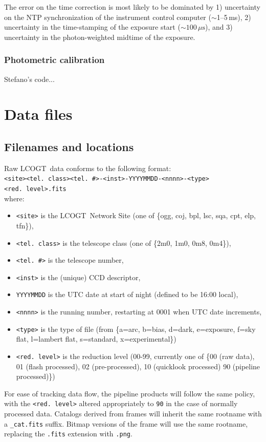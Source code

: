 \documentclass[twoside,11pt,nolof]{starlink}
\providecommand{\LCO}{LCOGT}
\providecommand{\rmn}[1] {\mathrm{#1}}
\begin{document}
The error on the time correction is most likely to be dominated by 1)
uncertainty on the NTP synchronization of the instrument control computer
($\sim$1--5\,ms), 2) uncertainty in the time-stamping of the exposure start
($\sim 100\,\mu\rmn{s}$), and 3) uncertainty in the photon-weighted midtime of the
exposure.

\subsubsection{Photometric calibration}
Stefano's code...

\section{Data files}

\subsection{Filenames and locations}
Raw \LCO\ data conforms to the following format:\\
\texttt{<site><tel.\ class><tel.\ \#>-<inst>-YYYYMMDD-<nnnn>-<type><red.\ level>.fits}\\
where:
\begin{itemize}
\item{\texttt{<site>}} is the \LCO\ Network Site (one of \{ogg, coj, bpl, lsc, sqa, cpt, elp, tfn\}),
\item{\texttt{<tel.\ class>}} is the telescope class (one of \{2m0, 1m0, 0m8, 0m4\}),
\item{\texttt{<tel.\ \#>}} is the telescope number,
\item{\texttt{<inst>}} is the (unique) CCD descriptor,
\item{\texttt{YYYYMMDD}} is the UTC date at start of night (defined to be 16:00 local),
\item{\texttt{<nnnn>}} is the running number, restarting at 0001 when UTC date increments,
\item{\texttt{<type>}} is the type of file (from \{a=arc, b=bias, d=dark, e=exposure, f=sky flat, l=lambert flat, s=standard, x=experimental\}) 
\item{\texttt{<red.\ level>}} is the reduction level (00-99, currently one of
\{00 (raw data), 01 (flash processed), 02 (pre-processed), 10 (quicklook
processed) 90 (pipeline processed)\})
\end{itemize}

For ease of tracking data flow, the pipeline products will follow the same
policy, with the \texttt{<red.\ level>} altered appropriately to \texttt{90} in
the case of normally processed data. Catalogs derived from frames will inherit
the same rootname with a \texttt{\_cat.fits} suffix. Bitmap versions of the
frame will use the same rootname, replacing the \texttt{.fits} extension with
\texttt{.png}.
\end{document}
